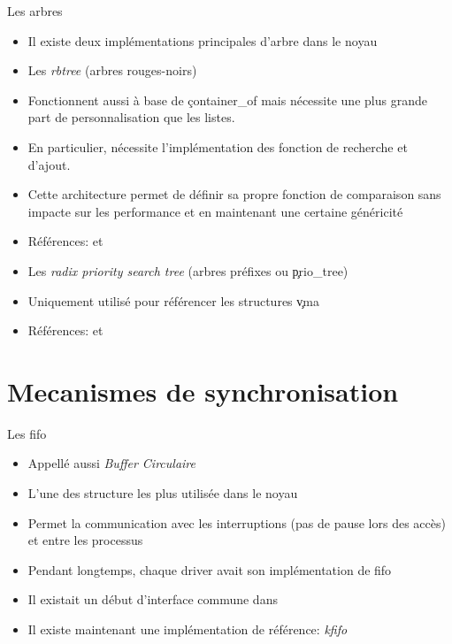 \begin{frame}[fragile=singleslide]{Les arbres}
  \begin{itemize} 
  \item  Il existe  deux implémentations  principales d'arbre  dans le
    noyau
  \item Les \emph{rbtree} (arbres rouges-noirs)
  \item Fonctionnent  aussi à base de  \c{container_of} mais nécessite
    une plus grande part de personnalisation que les listes.
  \item  En particulier,  nécessite l'implémentation  des  fonction de
    recherche et d'ajout.
  \item  Cette architecture permet  de définir  sa propre  fonction de
    comparaison sans impacte sur  les performance et en maintenant une
    certaine généricité
  \item       Références:            et
  \item  Les \emph{radix  priority  search tree}  (arbres préfixes  ou
    \c{prio_tree})
  \item Uniquement utilisé pour référencer les structures \c{vma}
  \item      Références:          et
  \end{itemize} 
\end{frame} 


\section{Mecanismes de synchronisation}

\begin{frame}[fragile=singleslide]{Les fifo}
  \begin{itemize} 
  \item Appellé aussi \emph{Buffer Circulaire}
  \item L'une des structure les plus utilisée dans le noyau
  \item Permet la communication avec les interruptions (pas de pause
    lors des accès) et entre les processus
  \item Pendant longtemps, chaque driver avait son implémentation de
    fifo
  \item    Il   existait   un    début   d'interface    commune   dans
  \item Il existe maintenant une implémentation de référence:
    \emph{kfifo}
  \end{itemize} 
\end{frame} 

